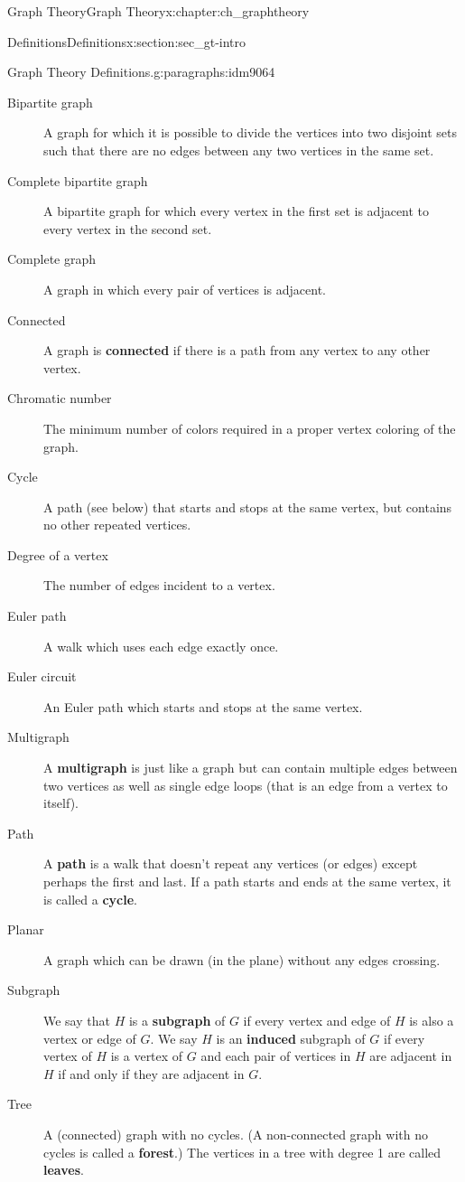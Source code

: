 \documentclass[oneside,10pt,]{book}
\newcommand{\terminology}[1]{\textbf{#1}}
\numberwithin{equation}{chapter}
\begin{document}
\begin{chapterptx}{Graph Theory}{}{Graph Theory}{}{}{x:chapter:ch_graphtheory}
\begin{sectionptx}{Definitions}{}{Definitions}{}{}{x:section:sec_gt-intro}
\begin{paragraphs}{Graph Theory Definitions.}{g:paragraphs:idm9064}
\begin{description}
\item[{Bipartite graph}] A graph for which it is possible to divide the vertices into two disjoint sets such that there are no edges between any two vertices in the same set.%
\item[{Complete bipartite graph}]A bipartite graph for which every vertex in the first set is adjacent to every vertex in the second set.%
\item[{Complete graph}] A graph in which every pair of vertices is adjacent.%
\item[{Connected}] A graph is \terminology{connected} if there is a path from any vertex to any other vertex.%
\item[{Chromatic number}] The minimum number of colors required in a proper vertex coloring of the graph.%
\item[{Cycle}] A path (see below) that starts and stops at the same vertex, but contains no other repeated vertices.%
\item[{Degree of a vertex}] The number of edges incident to a vertex.%
\item[{Euler path}]A walk which uses each edge exactly once.%
\item[{Euler circuit}] An Euler path which starts and stops at the same vertex.%
\item[{Multigraph}] A \terminology{multigraph} is just like a graph but can contain multiple edges between two vertices as well as single edge loops (that is an edge from a vertex to itself).%
\item[{Path}]A \terminology{path} is a walk that doesn't repeat any vertices (or edges) except perhaps the first and last.  If a path starts and ends at the same vertex, it is called a \terminology{cycle}.%
\item[{Planar}] A graph which can be drawn (in the plane) without any edges crossing.%
\item[{Subgraph}] We say that \(H\) is a \terminology{subgraph} of \(G\) if every vertex and edge of \(H\) is also a vertex or edge of \(G\). We say \(H\) is an \terminology{induced} subgraph of \(G\) if every vertex of \(H\) is a vertex of \(G\) and each pair of vertices in \(H\) are adjacent in \(H\) if and only if they are adjacent in \(G\).%
\item[{Tree}] A (connected) graph with no cycles. (A non-connected graph with no cycles is called a \terminology{forest}.) The vertices in a tree with degree 1 are called \terminology{leaves}.%

\end{description}
\end{paragraphs}
\end{sectionptx}
\end{chapterptx}
\end{document}
